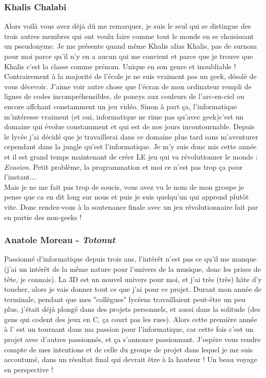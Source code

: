 \documentclass{report}
\begin{document}
\subsubsection*{Khalis Chalabi}

Alors voilà vous avez déjà dû me remarquer, je suis le seul qui se distingue des trois autres membres qui ont voulu faire comme tout le monde en se choisissant un pseudonyme. Je me présente quand même Khalis alias Khalis, pas de surnom pour moi parce qu'il n'y en a aucun qui me convient et parce que je trouve que Khalis c'est la classe comme prénom. Unique en son genre et inoubliable !\\
\newline
Contrairement à la majorité de l'école je ne suis vraiment pas un geek, désolé de vous décevoir. J'aime voir autre chose que l'écran de mon ordinateur rempli de lignes de codes incompréhensibles, de poneys aux couleurs de l'arc-en-ciel ou encore affchant constamment un jeu vidéo. Sinon à part ça, l'informatique m'intéresse vraiment (et oui, informatique ne rime pas qu'avec geek)c'est un domaine qui évolue constamment et qui est de nos jours incontournable. Depuis le lycée j'ai décidé que je travaillerai dans ce domaine plus tard sans m'aventurer cependant dans la jungle qu'est l'informatique. Je m'y suis donc mis cette année et il est grand temps maintenant de créer LE jeu qui va révolutionner le monde : \textit{Evasion}. Petit problème, la programmation et moi ce n'est pas trop ça pour l'instant...\\
\newline
Mais je ne me fait pas trop de soucis, vous avez vu le nom de mon groupe je pense que ca en dit long sur nous et puis je suis quelqu'un qui apprend plutôt vite. Donc rendez-vous à la soutenance finale avec un jeu révolutionnaire fait par en partie des non-geeks !

\subsubsection*{Anatole Moreau -  \textcolor{pseudoblue}{\textit{Totonut}}}

Passionné d'informatique depuis trois ans, l'intérêt n'est pas ce qu'il me manque (j'ai un intérêt de la même nature pour l'univers de la musique, donc les prises de tête, je connais). La 3D est un nouvel univers pour moi, et j'ai très (très) hâte d'y toucher, alors je vais donner tout ce que j'ai pour ce projet. 
Durant mon année de terminale, pendant que mes "collègues" lycéens travaillaient peut-être un peu plus, j'était déjà plongé dans des projets personnels, et aussi dans la solitude (des gens qui codent des jeux en C, ça court pas les rues). Alors cette première année à l' est un tournant dans ma passion pour l'informatique, car cette fois c'est un projet avec d'autres passionnés, et ça s'annonce passionnant. J'espère vous rendre compte de mes intentions et de celle du groupe de projet dans lequel je me suis accoutumé, dans un résultat final qui devrait être à la hauteur !
Un beau voyage en perspective !
\end{document}
